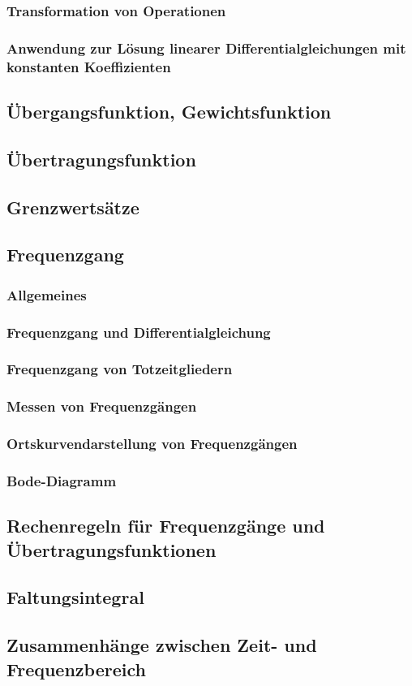 \subsubsection{Transformation von Operationen}


\subsubsection{Anwendung zur Lösung linearer Differentialgleichungen mit konstanten Koeffizienten}


\subsection{Übergangsfunktion, Gewichtsfunktion}


\subsection{Übertragungsfunktion}


\subsection{Grenzwertsätze}


\subsection{Frequenzgang}


\subsubsection{Allgemeines}


\subsubsection{Frequenzgang und Differentialgleichung}


\subsubsection{Frequenzgang von Totzeitgliedern}


\subsubsection{Messen von Frequenzgängen}


\subsubsection{Ortskurvendarstellung von Frequenzgängen}


\subsubsection{Bode-Diagramm}


\subsection{Rechenregeln für Frequenzgänge und Übertragungsfunktionen}


\subsection{Faltungsintegral}


\subsection{Zusammenhänge zwischen Zeit- und Frequenzbereich}
